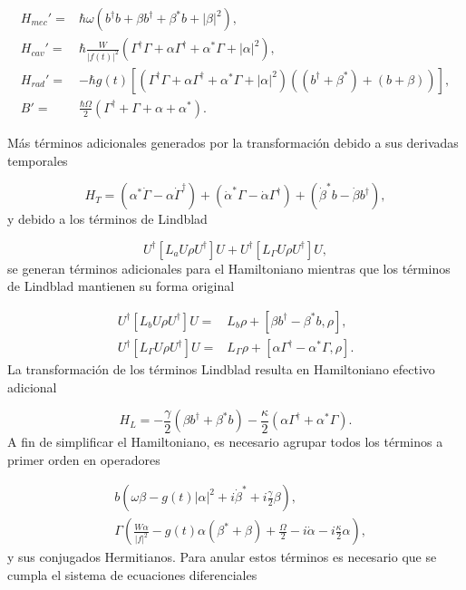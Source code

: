 \documentclass[10pt,a4paper]{report}
\begin{document}
\begin{align}
H_{mec}' =& \hbar \omega(b^{\dagger}b +\beta b^{\dagger}+\beta^* b + |\beta|^2),\\
H_{cav}' =& \hbar\frac{W}{|f(t)|^2}(\Gamma^{\dagger}\Gamma + \alpha \Gamma^{\dagger} + \alpha^* \Gamma + |\alpha|^2 ),\\
H_{rad}'=&-\hbar g(t)[(\Gamma^{\dagger}\Gamma + \alpha \Gamma^{\dagger} + \alpha^* \Gamma + |\alpha|^2 )((b^{\dagger}+\beta^*)+(b+\beta))],\\
B' =& \frac{\hbar \Omega}{2}(\Gamma^{\dagger} + \Gamma +\alpha + \alpha^*).
\end{align}

Más términos adicionales generados por la transformación debido a sus derivadas temporales

\begin{equation}
H_{T} = (\alpha^*\dot{\Gamma} - \alpha\dot{\Gamma}^\dagger) +(\dot{\alpha}^*\Gamma - \dot{\alpha}\Gamma^\dagger) +(\dot{\beta}^*b - \dot{\beta}b^\dagger),
\end{equation} y debido a los términos de Lindblad

\begin{equation}
U^\dagger [L_aU\rho U^\dagger]U + U^\dagger [L_\Gamma U\rho U^\dagger]U,
\end{equation} se generan términos adicionales para el Hamiltoniano mientras que los términos de Lindblad mantienen su forma original

\begin{align}
U^\dagger [L_bU\rho U^\dagger]U=& L_b\rho + [\beta b^\dagger - \beta^* b,\rho],\\
U^\dagger [L_\Gamma U\rho U^\dagger]U =& L_\Gamma \rho + [ \alpha \Gamma^\dagger - \alpha^* \Gamma,\rho].
\end{align} La transformación de los términos Lindblad resulta en  Hamiltoniano efectivo adicional

\begin{equation}
H_L = -\frac{\gamma}{2}(\beta b^\dagger + \beta^* b) -\frac{\kappa}{2}( \alpha \Gamma^\dagger + \alpha^* \Gamma).
\end{equation} A fin de simplificar el Hamiltoniano, es necesario agrupar todos los términos a primer orden en operadores

\begin{align}
&b(\omega\beta - g(t)|\alpha|^2 + i\dot{\beta}^* + i\frac{\gamma}{2}\beta),\\
&\Gamma(\frac{W\alpha}{|f|^2} -g(t)\alpha(\beta^*+\beta) + \frac{\Omega}{2}-i\dot{\alpha} - i\frac{\kappa}{2}\alpha),
\end{align} y sus conjugados Hermitianos. Para anular estos términos es necesario que se cumpla el sistema de ecuaciones diferenciales
\end{document}

